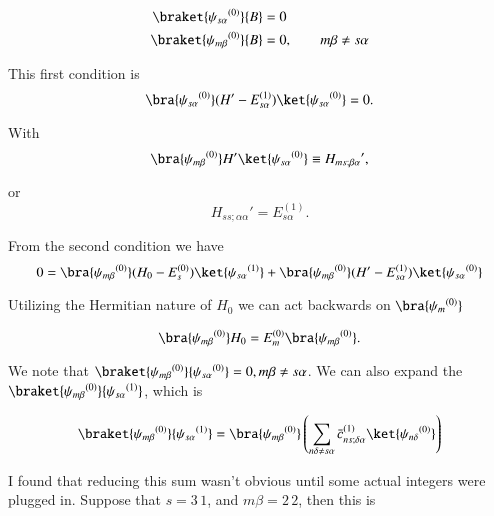 \begin{align}\label{eqn:qmTwoL5a:460}
\braket{{\psi_{s \alpha}}^{(0)}}{B} &= 0 \\
\braket{{\psi_{m \beta}}^{(0)}}{B} &= 0, \qquad m \beta \ne s \alpha
\end{align}

This first condition is
\begin{equation}\label{eqn:qmTwoL5a:480}
\bra{{\psi_{s \alpha}}^{(0)}} (H' - E_{s \alpha}^{(1)}) \ket{{\psi_{s \alpha}}^{(0)}} = 0.
\end{equation}

With
\begin{equation}\label{eqn:qmTwoL5a:500}
\bra{{\psi_{m \beta}}^{(0)}} H' \ket{{\psi_{s \alpha}}^{(0)}} \equiv {H_{ms ; \beta \alpha}}',
\end{equation}

or
\begin{equation}\label{eqn:qmTwoL5a:520}
{H_{ss ; \alpha \alpha}}' = E_{s \alpha}^{(1)}.
\end{equation}

From the second condition we have
\begin{equation}\label{eqn:qmTwoL5a:540}
0 = \bra{{\psi_{m \beta}}^{(0)}} 
(H_0 - E_s^{(0)}) \ket{{\psi_{s \alpha}}^{(1)}} 
+\bra{{\psi_{m \beta}}^{(0)}} 
(H' - E_{s \alpha}^{(1)}) \ket{{\psi_{s \alpha}}^{(0)}} 
\end{equation}

Utilizing the Hermitian nature of $H_0$ we can act backwards on $\bra{{\psi_m}^{(0)}}$ 

\begin{equation}\label{eqn:qmTwoL5a:560}
\bra{{\psi_{m \beta}}^{(0)}} H_0
=
E_m^{(0)} \bra{{\psi_{m \beta}}^{(0)}}.
\end{equation}

We note that $\braket{{\psi_{m \beta}}^{(0)}}{{\psi_{s \alpha}}^{(0)}} = 0, m \beta \ne s \alpha$.  We can also expand the $\braket{{\psi_{m \beta}}^{(0)}}{{\psi_{s \alpha}}^{(1)}}$, which is

\begin{align*}
\braket{{\psi_{m \beta}}^{(0)}}{{\psi_{s \alpha}}^{(1)}} 
&=
\bra{{\psi_{m \beta}}^{(0)}}
\left(
\sum_{n\delta \ne s\alpha} {\bar{c}_{ns;\delta \alpha}}^{(1)} \ket{{\psi_{n \delta}}^{(0)}}
\right) \\
\end{align*}

I found that reducing this sum wasn't obvious until some actual integers were plugged in.  Suppose that $s = 3\,1$, and $m \beta = 2\,2$, then this is

